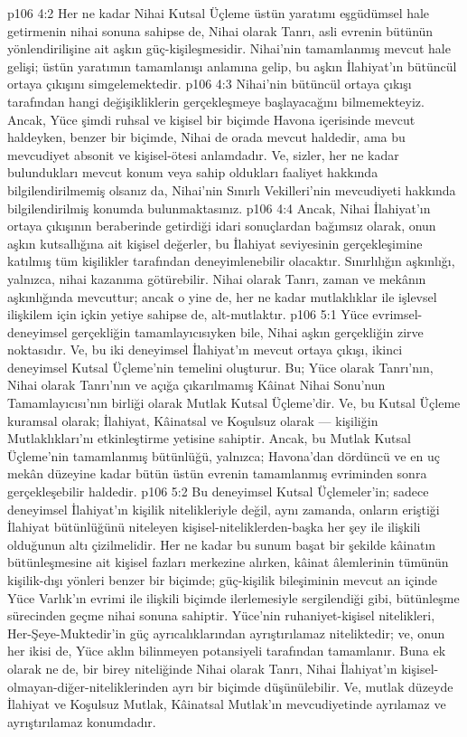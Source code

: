 \vs p106 4:2 Her ne kadar Nihai Kutsal Üçleme üstün yaratımı eşgüdümsel hale getirmenin nihai sonuna sahipse de, Nihai olarak Tanrı, asli evrenin bütünün yönlendirilişine ait aşkın güç\hyp{}kişileşmesidir. Nihai’nin tamamlanmış mevcut hale gelişi; üstün yaratımın tamamlanışı anlamına gelip, bu aşkın İlahiyat’ın bütüncül ortaya çıkışını simgelemektedir.
\vs p106 4:3 Nihai’nin bütüncül ortaya çıkışı tarafından hangi değişikliklerin gerçekleşmeye başlayacağını bilmemekteyiz. Ancak, Yüce şimdi ruhsal ve kişisel bir biçimde Havona içerisinde mevcut haldeyken, benzer bir biçimde, Nihai de orada mevcut haldedir, ama bu mevcudiyet absonit ve kişisel\hyp{}ötesi anlamdadır. Ve, sizler, her ne kadar bulundukları mevcut konum veya sahip oldukları faaliyet hakkında bilgilendirilmemiş olsanız da, Nihai’nin Sınırlı Vekilleri’nin mevcudiyeti hakkında bilgilendirilmiş konumda bulunmaktasınız.
\vs p106 4:4 Ancak, Nihai İlahiyat’ın ortaya çıkışının beraberinde getirdiği idari sonuçlardan bağımsız olarak, onun aşkın kutsallığına ait kişisel değerler, bu İlahiyat seviyesinin gerçekleşimine katılmış tüm kişilikler tarafından deneyimlenebilir olacaktır. Sınırlılığın aşkınlığı, yalnızca, nihai kazanıma götürebilir. Nihai olarak Tanrı, zaman ve mekânın aşkınlığında mevcuttur; ancak o yine de, her ne kadar mutlaklıklar ile işlevsel ilişkilem için içkin yetiye sahipse de, alt\hyp{}mutlaktır.
\vs p106 5:1 Yüce evrimsel\hyp{}deneyimsel gerçekliğin tamamlayıcısıyken bile, Nihai aşkın gerçekliğin zirve noktasıdır. Ve, bu iki deneyimsel İlahiyat’ın mevcut ortaya çıkışı, ikinci deneyimsel Kutsal Üçleme’nin temelini oluşturur. Bu; Yüce olarak Tanrı’nın, Nihai olarak Tanrı’nın ve açığa çıkarılmamış Kâinat Nihai Sonu’nun Tamamlayıcısı’nın birliği olarak Mutlak Kutsal Üçleme’dir. Ve, bu Kutsal Üçleme kuramsal olarak; İlahiyat, Kâinatsal ve Koşulsuz olarak --- kişiliğin Mutlaklıkları’nı etkinleştirme yetisine sahiptir. Ancak, bu Mutlak Kutsal Üçleme’nin tamamlanmış bütünlüğü, yalnızca; Havona’dan dördüncü ve en uç mekân düzeyine kadar bütün üstün evrenin tamamlanmış evriminden sonra gerçekleşebilir haldedir.
\vs p106 5:2 Bu deneyimsel Kutsal Üçlemeler’in; sadece deneyimsel İlahiyat’ın kişilik nitelikleriyle değil, aynı zamanda, onların eriştiği İlahiyat bütünlüğünü niteleyen kişisel\hyp{}niteliklerden\hyp{}başka her şey ile ilişkili olduğunun altı çizilmelidir. Her ne kadar bu sunum başat bir şekilde kâinatın bütünleşmesine ait kişisel fazları merkezine alırken, kâinat âlemlerinin tümünün kişilik\hyp{}dışı yönleri benzer bir biçimde; güç\hyp{}kişilik bileşiminin mevcut an içinde Yüce Varlık’ın evrimi ile ilişkili biçimde ilerlemesiyle sergilendiği gibi, bütünleşme sürecinden geçme nihai sonuna sahiptir. Yüce’nin ruhaniyet\hyp{}kişisel nitelikleri, Her\hyp{}Şeye\hyp{}Muktedir’in güç ayrıcalıklarından ayrıştırılamaz niteliktedir; ve, onun her ikisi de, Yüce aklın bilinmeyen potansiyeli tarafından tamamlanır. Buna ek olarak ne de, bir birey niteliğinde Nihai olarak Tanrı, Nihai İlahiyat’ın kişisel\hyp{}olmayan\hyp{}diğer\hyp{}niteliklerinden ayrı bir biçimde düşünülebilir. Ve, mutlak düzeyde İlahiyat ve Koşulsuz Mutlak, Kâinatsal Mutlak’ın mevcudiyetinde ayrılamaz ve ayrıştırılamaz konumdadır.
